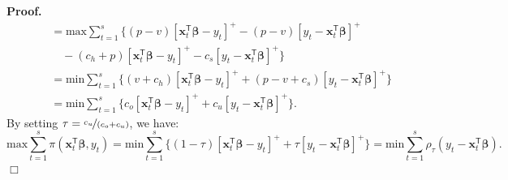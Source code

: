 \documentclass{article}
\newenvironment{proof}
 {\begin{trivlist} \item[] {\bf Proof.\ }}{\hfill$\Box$ \end{trivlist}}
\begin{document}
\begin{proof}
\[\begin{aligned}
        &\quad=\text{max}\displaystyle\sum_{t=1}^s\{(p-v)[\mathbf{x}_t^{\mathsf{T}}\boldsymbol{\beta}-y_t]^+-(p-v)[y_t-\mathbf{x}_t^{\mathsf{T}}\boldsymbol{\beta}]^+\\
        &\qquad-(c_h+p)[\mathbf{x}_t^{\mathsf{T}}\boldsymbol{\beta}-y_t]^+-c_s[y_t-\mathbf{x}_t^{\mathsf{T}}\boldsymbol{\beta}]^+\}\\
        &\quad=\text{min}\displaystyle\sum_{t=1}^s\{(v+c_h)[\mathbf{x}_t^{\mathsf{T}}\boldsymbol{\beta}-y_t]^++(p-v+c_s)[y_t-\mathbf{x}_t^{\mathsf{T}}\boldsymbol{\beta}]^+\}\\
        &\quad=\text{min}\displaystyle\sum_{t=1}^s\{c_o[\mathbf{x}_t^{\mathsf{T}}\boldsymbol{\beta}-y_t]^++c_u[y_t-\mathbf{x}_t^{\mathsf{T}}\boldsymbol{\beta}]^+\}.
    \end{aligned}
\]
By setting $\tau=\nicefrac{c_u}{(c_o+c_u)}$, we have:
\[
    \text{max}\displaystyle\sum_{t=1}^s{\pi(\mathbf{x}_t^{\mathsf{T}}\boldsymbol{\beta},y_t)}=\text{min}\displaystyle\sum_{t=1}^s\{(1-\tau)[\mathbf{x}_t^{\mathsf{T}}\boldsymbol{\beta}-y_t]^++\tau[y_t-\mathbf{x}_t^{\mathsf{T}}\boldsymbol{\beta}]^+\}=\text{min}\displaystyle\sum_{t=1}^s\rho_{\tau}(y_t-\mathbf{x}_t^{\mathsf{T}}\boldsymbol{\beta}).
\]
\end{proof}


\printbibliography
\end{document}
